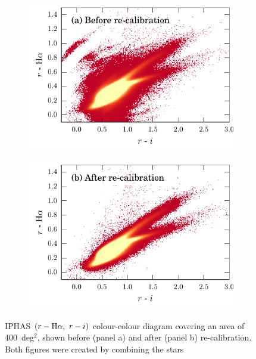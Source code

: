 \documentclass[a4paper,useAMS,usenatbib]{mn2e}
\def\ha{\mbox{H$\rm \alpha$}}
\begin{document}
\begin{figure}
\captionsetup[subfigure]{labelformat=empty}
\begin{subfigure}[b]{\linewidth}
\centering
\includegraphics[width=\textwidth]{figures/caldiagram/ccd-uncalibrated.pdf}
\caption{}
\label{fig:ccd_before}
\end{subfigure}
\begin{subfigure}[b]{\linewidth}
\centering
\includegraphics[width=\textwidth]{figures/caldiagram/ccd-calibrated.pdf}
\caption{}
\label{fig:ccd_after}
\end{subfigure}
\caption{IPHAS $(r-\ha,\ r-i)$ colour-colour diagram
         covering an area of 400~deg$^2$,
         shown before (panel a) and after (panel b)
         re-calibration.
         Both figures were created by combining the stars
}
\end{figure}
\end{document}
